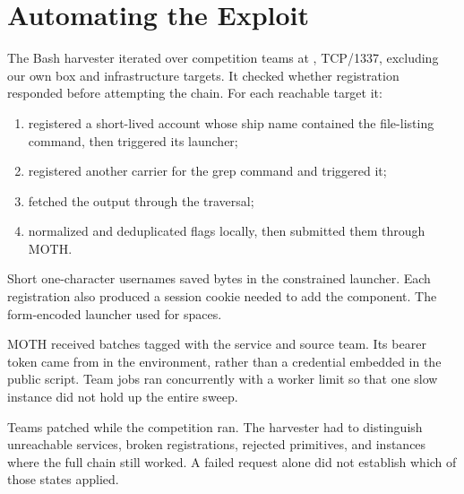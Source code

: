 \section{Automating the Exploit}
\label{sec:automation}

The Bash harvester iterated over competition teams at
, TCP/1337, excluding our own box and
infrastructure targets. It checked whether registration responded before
attempting the chain. For each reachable target it:

\begin{enumerate}
  \item registered a short-lived account whose ship name contained the
        file-listing command, then triggered its  launcher;
  \item registered another carrier for the grep command and triggered it;
  \item fetched the output through the  traversal;
  \item normalized and deduplicated flags locally, then submitted them
        through MOTH.
\end{enumerate}

Short one-character usernames saved bytes in the constrained launcher.
Each registration also produced a session cookie needed to add the
component. The form-encoded launcher used  for spaces.

MOTH received batches tagged with the service and source team. Its bearer
token came from  in the environment, rather than a
credential embedded in the public script. Team jobs ran concurrently with
a worker limit so that one slow instance did not hold up the entire sweep.

Teams patched while the competition ran. The harvester had to distinguish
unreachable services, broken registrations, rejected primitives, and
instances where the full chain still worked. A failed request alone did
not establish which of those states applied.
